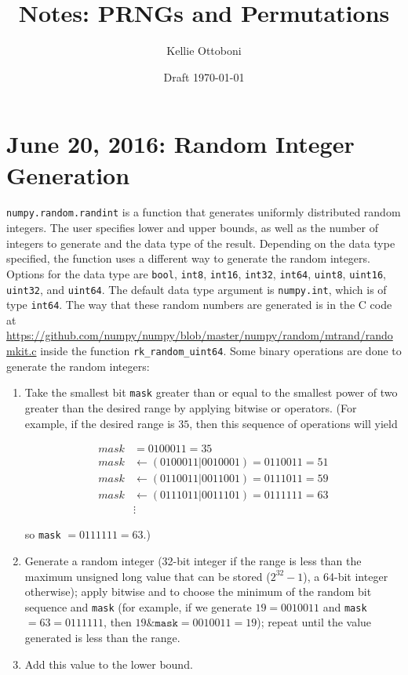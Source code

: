 \documentclass[12pt]{article}
\title{Notes: PRNGs and Permutations}
\author{Kellie Ottoboni}
\date{Draft \today}
\begin{document}
\maketitle





\section{June 20, 2016: Random Integer Generation}
\texttt{numpy.random.randint} is a function that generates uniformly distributed random integers.
The user specifies lower and upper bounds, as well as the number of integers to generate and the data type of the result.
Depending on the data type specified, the function uses a different way to generate the random integers.
Options for the data type are \texttt{bool}, \texttt{int8}, \texttt{int16}, \texttt{int32}, \texttt{int64}, \texttt{uint8}, \texttt{uint16}, \texttt{uint32}, and \texttt{uint64}.
The default data type argument is \texttt{numpy.int}, which is of type \texttt{int64}.
The way that these random numbers are generated is in the C code at \url{https://github.com/numpy/numpy/blob/master/numpy/random/mtrand/randomkit.c} inside the function \texttt{rk\_random\_uint64}.
Some binary operations are done to generate the random integers:

\begin{enumerate}
\item{ Take the smallest bit \texttt{mask} greater than or equal to the smallest power of two greater than the desired range by applying bitwise or operators. (For example, if the desired range is $35$, then this sequence of operations will yield

\begin{align*}
mask &= 0100011 = 35\\
mask &\leftarrow (0100011 \vert 0010001) = 0110011 = 51 \\
mask &\leftarrow (0110011 \vert 0011001) = 0111011 = 59 \\
mask &\leftarrow (0111011 \vert 0011101) = 0111111 = 63 \\
& \vdots
\end{align*}

so \texttt{mask} $ = 0111111 = 63$.)
}
\item{ Generate a random integer (32-bit integer if the range is less than the maximum unsigned long value that can be stored ($2^{32}-1$), a 64-bit integer otherwise); 
apply bitwise and  to choose the minimum of the random bit sequence and \texttt{mask}
(for example, if we generate $19 = 0010011$ and \texttt{mask} $= 63 = 0111111$, then $19 \& \texttt{mask}  = 0010011 = 19$);
repeat until the value generated is less than the range.
}
\item Add this value to the lower bound.
\end{enumerate}
\end{document}
